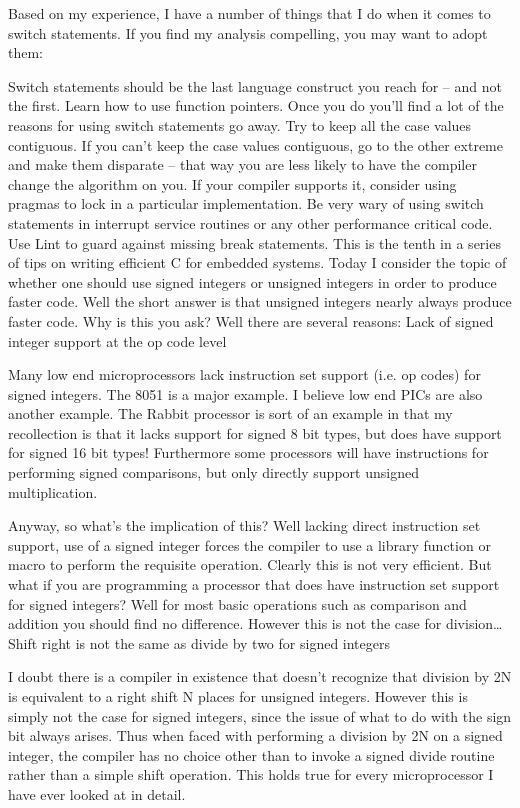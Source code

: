 {{{{{{{{{{Based on my experience, I have a number of things that I do when it comes to switch statements. If you find my analysis compelling, you may want to adopt them:

    Switch statements should be the last language construct you reach for – and not the first.
    Learn how to use function pointers. Once you do you’ll find a lot of the reasons for using switch statements go away.
    Try to keep all the case values contiguous.
    If you can’t keep the case values contiguous, go to the other extreme and make them disparate – that way you are less likely to have the compiler change the algorithm on you.
    If your compiler supports it, consider using pragmas to lock in a particular implementation.
    Be very wary of using switch statements in interrupt service routines or any other performance critical code.
    Use Lint to guard against missing break statements.
This is the tenth in a series of tips on writing efficient C for embedded systems. Today I consider the topic of whether one should use signed integers or unsigned integers in order to produce faster code. Well the short answer is that unsigned integers nearly always produce faster code. Why is this you ask? Well there are several reasons:
Lack of signed integer support at the op code level

Many low end microprocessors lack instruction set support (i.e. op codes) for signed integers. The 8051 is a major example. I believe low end PICs are also another example. The Rabbit processor is sort of an example in that my recollection is that it lacks support for signed 8 bit types, but does have support for signed 16 bit types! Furthermore some processors will have instructions for performing signed comparisons, but only directly support unsigned multiplication.

Anyway, so what’s the implication of this? Well lacking direct instruction set support, use of a signed integer forces the compiler to use a library function or macro to perform the requisite operation. Clearly this is not very efficient. But what if you are programming a processor that does have instruction set support for signed integers? Well for most basic operations such as comparison and addition you should find no difference. However this is not the case for division…
Shift right is not the same as divide by two for signed integers

I doubt there is a compiler in existence that doesn’t recognize that division by 2N is equivalent to a right shift N places for unsigned integers. However this is simply not the case for signed integers, since the issue of what to do with the sign bit always arises. Thus when faced with performing a division by 2N on a signed integer, the compiler has no choice other than to invoke a signed divide routine rather than a simple shift operation. This holds true for every microprocessor I have ever looked at in detail.

}}}}}}}}}}
